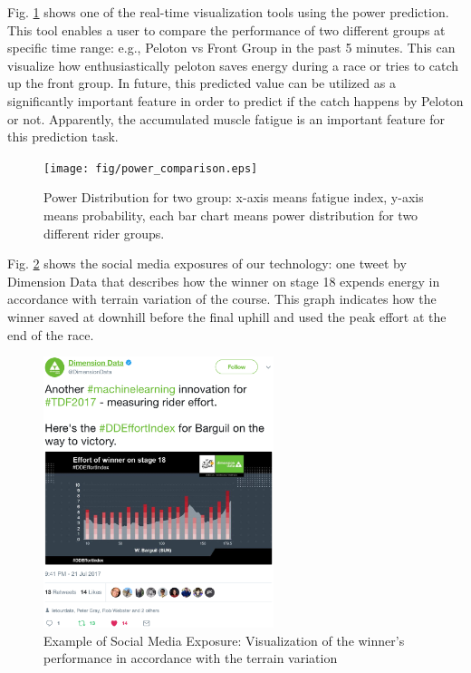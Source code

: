 \documentclass[runningheads]{llncs}
\begin{document}
Fig. \ref{fig:power_comparison_2group} shows one of the real-time visualization tools using the power prediction. This tool enables a user to compare the performance of two different groups at specific time range: e.g., Peloton vs Front Group in the past 5 minutes. This can visualize how enthusiastically peloton saves energy during a race or tries to catch up the front group. In future, this predicted value can be utilized as a significantly important feature in order to predict if the catch happens by Peloton or not. Apparently, the accumulated muscle fatigue is an important feature for this prediction task.

\begin{figure}[t]
 \begin{center}
 \texttt{[image: fig/power\_comparison.eps]}
 \caption{Power Distribution for two group: x-axis means fatigue index, y-axis means probability, each bar chart means power distribution for two different rider groups.}
 \label{fig:power_comparison_2group}
 \end{center}
\end{figure}

Fig. \ref{fig:power_prediction_graph} shows the social media exposures of our technology: one tweet by Dimension Data that describes how the winner on stage 18 expends energy in accordance with terrain variation of the course. This graph indicates how the winner saved at downhill before the final uphill and used the peak effort at the end of the race.

\begin{figure}[t]
 \begin{center}
 \includegraphics[width=0.6\textwidth]{fig/TDF_tweet_power_prediction2.eps}
 \caption{Example of Social Media Exposure: Visualization of the winner's performance in accordance with the terrain variation}
 \label{fig:power_prediction_graph}
 \end{center}
\end{figure}
\end{document}
